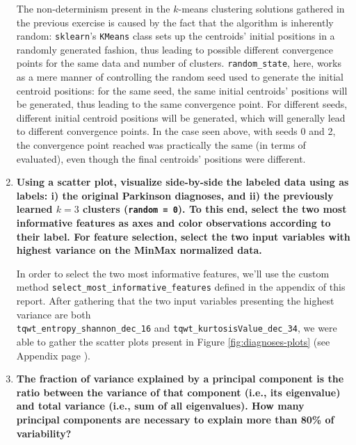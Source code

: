 \documentclass[12pt]{article}
\begin{document}
\begin{enumerate}[leftmargin=\labelsep,resume]
        The non-determinism present in the $k$-means clustering solutions gathered
        in the previous exercise is caused by the fact that the algorithm is
        inherently random: \texttt{sklearn}'s \texttt{KMeans} class sets up
        the centroids' initial positions in a randomly generated fashion,
        thus leading to possible different convergence points for the same
        data and number of clusters. \texttt{random\_state}, here, works
        as a mere manner of controlling the random seed used to generate
        the initial centroid positions: for the same seed, the same
        initial centroids' positions will be generated, thus leading to
        the same convergence point. For different seeds, different
        initial centroid positions will be generated, which will generally lead
        to different convergence points. In the case seen above, with seeds 0
        and 2, the convergence point reached was practically the same (in terms of
        evaluated), even though the final centroids' positions were different.

        \pagebreak

  \item \textbf{Using a scatter plot, visualize side-by-side the labeled data using as labels: i) the original
          Parkinson diagnoses, and ii) the previously learned $k = 3$ clusters (\texttt{random = 0}). To this end, select
          the two most informative features as axes and color observations according to their label. For feature
          selection, select the two input variables with highest variance on the MinMax normalized data.}

        In order to select the two most informative features, we'll use the
        custom method \texttt{select\_most\_informative\_features} defined in
        the appendix of this report. After gathering that the two
        input variables presenting the highest variance are both \\
        \texttt{tqwt\_entropy\_shannon\_dec\_16} and
        \texttt{tqwt\_kurtosisValue\_dec\_34}, we were able to gather the
        scatter plots present in Figure \ref{fig:diagnoses-plots}
        (see Appendix page \pageref{fig:diagnoses-plots}).

  \item \textbf{The fraction of variance explained by a principal component is the ratio between the
          variance of that component (i.e., its eigenvalue) and total variance (i.e., sum of all eigenvalues).
          How many principal components are necessary to explain more than 80\% of variability?}


\end{enumerate}
\end{document}
